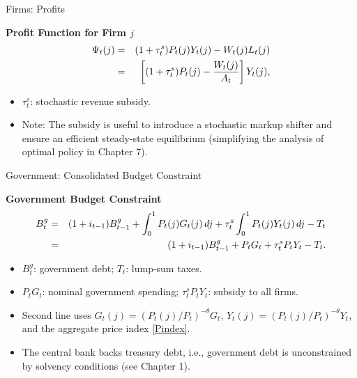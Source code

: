 \documentclass[11pt,aspectratio=169]{beamer}
\begin{document}
\begin{frame}[label=FirmProfits]{Firms: Profits}
\small

\textbf{Profit Function for Firm $j$}
\vspace{0.2cm}
\begin{eqnarray}
\Psi_t(j) &=& (1+\tau_t^s) P_t(j) Y_t(j) - W_t(j) L_t(j) \notag \\
&=& \left[ (1+\tau_t^s) P_t(j) - \frac{W_t(j)}{A_t} \right] Y_t(j),
\label{Profits}
\end{eqnarray}

\begin{itemize}
  \item $\tau_t^s$: stochastic revenue subsidy.
  \item Note: The subsidy is useful to introduce a stochastic markup shifter and ensure an efficient steady-state equilibrium (simplifying the analysis of optimal policy in Chapter 7).
\end{itemize}

\end{frame}


\begin{frame}[label=Government]{Government: Consolidated Budget Constraint}
\small

\textbf{Government Budget Constraint}
\vspace{0.2cm}
\begin{eqnarray}
B_t^g &=& (1+i_{t-1}) B_{t-1}^g + \int_0^1 P_t(j) G_t(j) \, dj + 
\tau_t^s \int_0^1 P_t(j) Y_t(j) \, dj - T_t \notag \\
&=& (1+i_{t-1}) B_{t-1}^g + P_t G_t + \tau_t^s P_t Y_t - T_t.
\label{BCTreasury2}
\end{eqnarray}

\begin{itemize}
  \item $B_t^g$: government debt; $T_t$: lump-sum taxes.  
  \item $P_t G_t$: nominal government spending; $\tau_t^s P_t Y_t$: subsidy to all firms.  
  \item Second line uses $G_t(j) = (P_t(j)/P_t)^{-\theta} G_t$, $Y_t(j) = (P_t(j)/P_t)^{-\theta} Y_t$, and the aggregate price index \eqref{Pindex}.  
  \item The central bank backs treasury debt, i.e., government debt is unconstrained by solvency conditions (see Chapter 1).
\end{itemize}

\end{frame}
\end{document}
